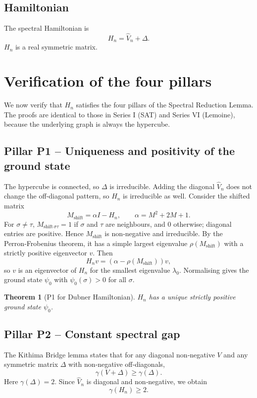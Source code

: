 \documentclass[11pt,a4paper]{article}
\newtheorem{theorem}{Theorem}[section]
\begin{document}
\subsection{Hamiltonian}
The spectral Hamiltonian is
\[
H_n = \hat{V}_n + \Delta.
\]
\(H_n\) is a real symmetric matrix.

\section{Verification of the four pillars}

We now verify that \(H_n\) satisfies the four pillars of the Spectral Reduction Lemma. The proofs are identical to those in Series I (SAT) and Series VI (Lemoine), because the underlying graph is always the hypercube.

\subsection{Pillar P1 – Uniqueness and positivity of the ground state}

The hypercube is connected, so \(\Delta\) is irreducible. Adding the diagonal \(\hat{V}_n\) does not change the off‑diagonal pattern, so \(H_n\) is irreducible as well. Consider the shifted matrix
\[
M_{\text{shift}} = \alpha I - H_n,\qquad \alpha = M^2 + 2M + 1.
\]
For \(\sigma\neq\tau\), \(M_{\text{shift}\,\sigma\tau} = 1\) if \(\sigma\) and \(\tau\) are neighbours, and \(0\) otherwise; diagonal entries are positive. Hence \(M_{\text{shift}}\) is non‑negative and irreducible. By the Perron‑Frobenius theorem, it has a simple largest eigenvalue \(\rho(M_{\text{shift}})\) with a strictly positive eigenvector \(v\). Then
\[
H_n v = (\alpha - \rho(M_{\text{shift}})) v,
\]
so \(v\) is an eigenvector of \(H_n\) for the smallest eigenvalue \(\lambda_0\). Normalising gives the ground state \(\psi_0\) with \(\psi_0(\sigma) > 0\) for all \(\sigma\).

\begin{theorem}[P1 for Dubner Hamiltonian]
\(H_n\) has a unique strictly positive ground state \(\psi_0\).
\end{theorem}

\subsection{Pillar P2 – Constant spectral gap}

The Kithima Bridge lemma states that for any diagonal non‑negative \(V\) and any symmetric matrix \(\Delta\) with non‑negative off‑diagonals,
\[
\gamma(V + \Delta) \ge \gamma(\Delta).
\]
Here \(\gamma(\Delta) = 2\). Since \(\hat{V}_n\) is diagonal and non‑negative, we obtain
\[
\gamma(H_n) \ge 2.
\]
\end{document}
